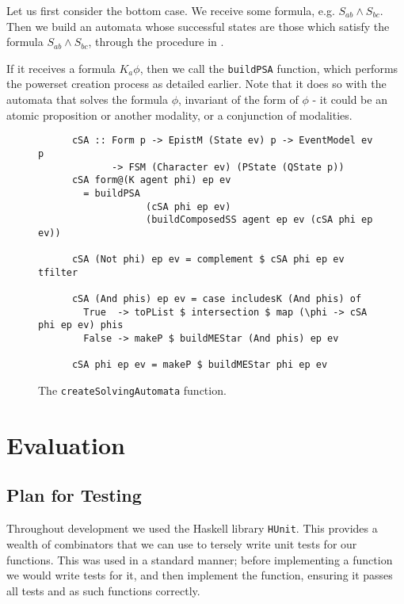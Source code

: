 \documentclass[12pt, a4paper]{article}
\begin{document}
Let us first consider the bottom case. We receive some formula, e.g. $S_{ab}
\land S_{bc}$. Then we build an automata \mestar whose successful states are
those which satisfy the formula $S_{ab} \land S_{bc}$, through the procedure in
. 

If it receives a formula $K_a \phi$, then we call the \texttt{buildPSA}
function, which performs the powerset creation process as detailed earlier. Note
that it does so with the automata that solves the formula $\phi$, invariant of
the form of $\phi$ - it could be an atomic proposition or another modality, or a
conjunction of modalities. 

\begin{figure}[h]
  \centering
    \begin{verbatim}
      cSA :: Form p -> EpistM (State ev) p -> EventModel ev p
             -> FSM (Character ev) (PState (QState p))
      cSA form@(K agent phi) ep ev
        = buildPSA 
                   (cSA phi ep ev) 
                   (buildComposedSS agent ep ev (cSA phi ep ev)) 

      cSA (Not phi) ep ev = complement $ cSA phi ep ev tfilter

      cSA (And phis) ep ev = case includesK (And phis) of
        True  -> toPList $ intersection $ map (\phi -> cSA phi ep ev) phis
        False -> makeP $ buildMEStar (And phis) ep ev

      cSA phi ep ev = makeP $ buildMEStar phi ep ev
    \end{verbatim}
  \caption{The \texttt{createSolvingAutomata} function.}
  \label{fig:createSolvingAutomata}
\end{figure}

\newpage

\section{Evaluation}

\subsection{Plan for Testing}

Throughout development we used the Haskell library \texttt{HUnit}. This provides
a wealth of combinators that we can use to tersely write unit tests for our
functions. This was used in a standard manner; before implementing a function we
would write tests for it, and then implement the function, ensuring it passes
all tests and as such functions correctly.
\end{document}
